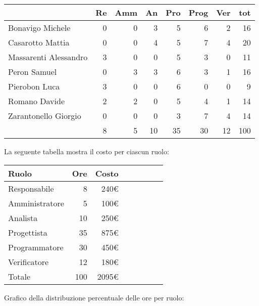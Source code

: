\begin{table}[H]
    \begin{tabularx}{\linewidth}{X|rrrrrrr}
    \rowcolor{gray!30}& Re & Amm & An & Pro & Prog & Ver & tot \\
    \hline
    Bonavigo Michele                        & 0 & 0 & 3 & 5 & 6 & 2 & 16 \\
    \rowcolor{gray!10}Casarotto Mattia      & 0 & 0 & 4 & 5 & 7 & 4 & 20 \\
    Massarenti Alessandro                   & 3 & 0 & 0 & 5 & 3 & 0 & 11 \\
    \rowcolor{gray!10}Peron Samuel          & 0 & 3 & 3 & 6 & 3 & 1 & 16 \\
    Pierobon Luca                           & 3 & 0 & 0 & 6 & 0 & 0 & 9  \\
    \rowcolor{gray!10}Romano Davide         & 2 & 2 & 0 & 5 & 4 & 1 & 14 \\
    Zarantonello Giorgio                    & 0 & 0 & 0 & 3 & 7 & 4 & 14 \\
    \hline                                  & 8 & 5 & 10 & 35 & 30 & 12 & 100 \\ 
    \end{tabularx}
\end{table}

La seguente tabella mostra il costo per ciascun ruolo:
\begin{table}[H]
    \begin{tabularx}{\linewidth}{X|rrrrrrr}
    \rowcolor{gray!30}Ruolo & Ore & Costo \\
    \hline
    Responsabile                            & 8 & 240€ \\
    \rowcolor{gray!10}Amministratore        & 5 & 100€ \\
    Analista                                & 10 & 250€ \\
    \rowcolor{gray!10}Progettista           & 35 & 875€ \\
    Programmatore                           & 30 & 450€ \\
    \rowcolor{gray!10}Verificatore          & 12 & 180€ \\
    \hline Totale                           & 100 & 2095€ \\ 
    \end{tabularx}
\end{table}

Grafico della distribuzione percentuale delle ore per ruolo:
\begin{center}
\end{center}

